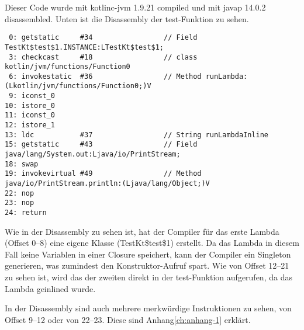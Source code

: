 Dieser Code wurde mit kotlinc-jvm 1.9.21 compiled und mit javap 14.0.2 disassembled.
Unten ist die Disassembly der test-Funktion zu sehen.

\begin{verbatim}
 0: getstatic     #34                 // Field TestKt$test$1.INSTANCE:LTestKt$test$1;
 3: checkcast     #18                 // class kotlin/jvm/functions/Function0
 6: invokestatic  #36                 // Method runLambda:(Lkotlin/jvm/functions/Function0;)V
 9: iconst_0
10: istore_0
11: iconst_0
12: istore_1
13: ldc           #37                 // String runLambdaInline
15: getstatic     #43                 // Field java/lang/System.out:Ljava/io/PrintStream;
18: swap
19: invokevirtual #49                 // Method java/io/PrintStream.println:(Ljava/lang/Object;)V
22: nop
23: nop
24: return
\end{verbatim}

Wie in der Disassembly zu sehen ist, hat der Compiler für das erste Lambda (Offset 0--8) eine eigene Klasse
(TestKt\$test\$1) erstellt.
Da das Lambda in diesem Fall keine Variablen in einer Closure speichert, kann der Compiler ein Singleton generieren,
was zumindest den Konstruktor-Aufruf spart.
Wie von Offset 12--21 zu sehen ist, wird das  der zweiten direkt in der test-Funktion
aufgerufen, da das Lambda geinlined wurde.

\begin{infoBox}
In der Disassembly sind auch mehrere merkwürdige Instruktionen zu sehen, \zB von Offset 9--12 oder von 22--23.
Diese sind Anhang\ref{ch:anhang-1} erklärt.
\end{infoBox}

\renewcommand{\kapitelautor}{}
